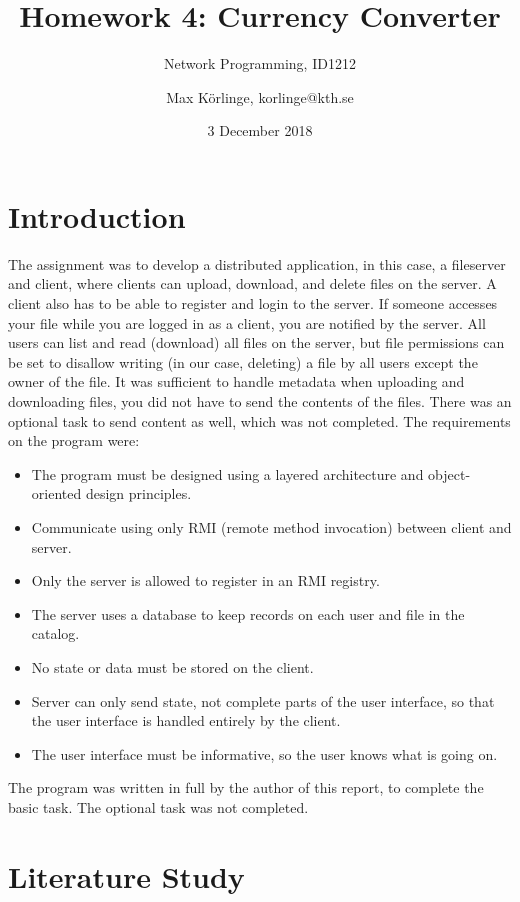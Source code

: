 \documentclass[a4paper]{scrartcl}
\title{Homework 4: Currency Converter}
\subtitle{Network Programming, ID1212}
\author{Max Körlinge, korlinge@kth.se}
\date{3 December 2018}
\begin{document}
\maketitle


\section{Introduction}

\noindent The assignment was to develop a distributed application, in this case, a fileserver and client, where clients can upload, download, and delete files on the server. A client also has to be able to register and login to the server. If someone accesses your file while you are logged in as a client, you are notified by the server. All users can list and read (download) all files on the server, but file permissions can be set to disallow writing (in our case, deleting) a file by all users except the owner of the file. It was sufficient to handle metadata when uploading and downloading files, you did not have to send the contents of the files. There was an optional task to send content as well, which was not completed. The requirements on the program were:

\begin{itemize}
    \item The program must be designed using a layered architecture and object-oriented design principles.
    \item Communicate using only RMI (remote method invocation) between client and server.
    \item Only the server is allowed to register in an RMI registry.
    \item The server uses a database to keep records on each user and file in the catalog.
    \item No state or data must be stored on the client.
    \item Server can only send state, not complete parts of the user interface, so that the user interface is handled entirely by the client.
    \item The user interface must be informative, so the user knows what is going on.
\end{itemize}

The program was written in full by the author of this report, to complete the basic task. The optional task was not completed.

\section{Literature Study}
\end{document}
